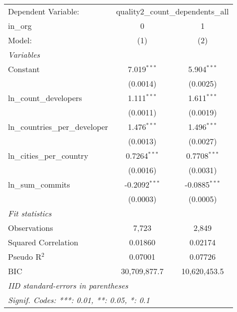 \begingroup
\centering
\begin{tabular}{lcc}
   \tabularnewline \midrule \midrule
   Dependent Variable: & \multicolumn{2}{c}{quality2\_count\_dependents\_all}\\
   in\_org                          & 0               & 1 \\   
   Model:                           & (1)             & (2)\\  
   \midrule
   \emph{Variables}\\
   Constant                         & 7.019$^{***}$   & 5.904$^{***}$\\   
                                    & (0.0014)        & (0.0025)\\   
   ln\_count\_developers            & 1.111$^{***}$   & 1.611$^{***}$\\   
                                    & (0.0011)        & (0.0019)\\   
   ln\_countries\_per\_developer    & 1.476$^{***}$   & 1.496$^{***}$\\   
                                    & (0.0013)        & (0.0027)\\   
   ln\_cities\_per\_country         & 0.7264$^{***}$  & 0.7708$^{***}$\\   
                                    & (0.0016)        & (0.0031)\\   
   ln\_sum\_commits                 & -0.2092$^{***}$ & -0.0885$^{***}$\\   
                                    & (0.0003)        & (0.0005)\\   
   \midrule
   \emph{Fit statistics}\\
   Observations                     & 7,723           & 2,849\\  
   Squared Correlation              & 0.01860         & 0.02174\\  
   Pseudo R$^2$                     & 0.07001         & 0.07726\\  
   BIC                              & 30,709,877.7    & 10,620,453.5\\  
   \midrule \midrule
   \multicolumn{3}{l}{\emph{IID standard-errors in parentheses}}\\
   \multicolumn{3}{l}{\emph{Signif. Codes: ***: 0.01, **: 0.05, *: 0.1}}\\
\end{tabular}
\par\endgroup


